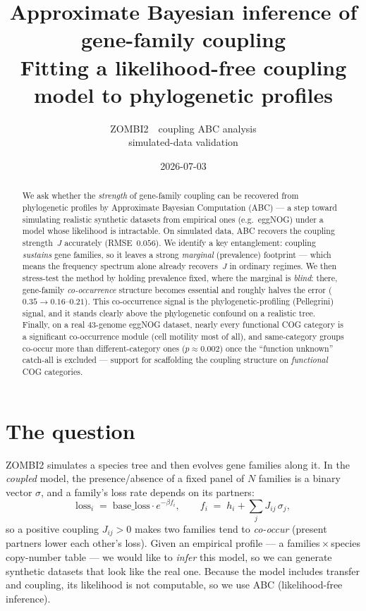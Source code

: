 \documentclass[11pt]{article}
\title{\vspace{-1.5em}\textbf{\Large Approximate Bayesian inference of gene-family coupling}\\[0.35em]
  \large Fitting a likelihood-free coupling model to phylogenetic profiles}
\author{ZOMBI2 \,\textbullet\, coupling ABC analysis\\ \small\color{muted} simulated-data validation}
\date{\small 2026-07-03}
\begin{document}
\maketitle
\vspace{-1.6em}

\begin{abstract}\noindent
We ask whether the \emph{strength} of gene-family coupling can be recovered from
phylogenetic profiles by Approximate Bayesian Computation (ABC) --- a step toward simulating
realistic synthetic datasets from empirical ones (e.g.\ eggNOG) under a model whose likelihood
is intractable. On simulated data, ABC recovers the coupling strength~$J$ accurately
(RMSE~$0.056$). We identify a key entanglement: coupling \emph{sustains} gene families, so it
leaves a strong \emph{marginal} (prevalence) footprint --- which means the frequency spectrum
alone already recovers~$J$ in ordinary regimes. We then stress-test the method by holding
prevalence fixed, where the marginal is \emph{blind}: there, gene-family \emph{co-occurrence}
structure becomes essential and roughly halves the error ($0.35\!\to\!0.16$--$0.21$). This
co-occurrence signal is the phylogenetic-profiling (Pellegrini) signal, and it stands clearly
above the phylogenetic confound on a realistic tree. Finally, on a real $43$-genome eggNOG dataset,
nearly every functional COG category is a significant co-occurrence module (cell motility most of
all), and same-category groups co-occur more than different-category ones ($p\approx0.002$) once the
``function unknown'' catch-all is excluded --- support for scaffolding the coupling structure on
\emph{functional} COG categories.
\end{abstract}

\section{The question}

ZOMBI2 simulates a species tree and then evolves gene families along it. In the
\emph{coupled} model, the presence/absence of a fixed panel of $N$ families is a
binary vector $\sigma$, and a family's loss rate depends on its partners:
\[
\text{loss}_i \;=\; \text{base\_loss}\cdot e^{-\beta f_i},\qquad
f_i \;=\; h_i + \textstyle\sum_j J_{ij}\,\sigma_j ,
\]
so a positive coupling $J_{ij}>0$ makes two families tend to \emph{co-occur} (present partners
lower each other's loss). Given an empirical profile --- a families\,$\times$\,species
copy-number table --- we would like to \emph{infer} this model, so we can generate synthetic
datasets that look like the real one. Because the model includes transfer and coupling, its
likelihood is not computable, so we use ABC (likelihood-free inference).
\end{document}
